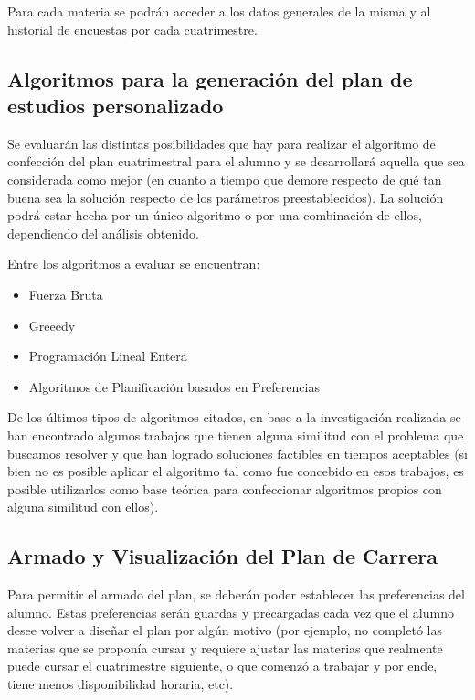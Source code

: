 \documentclass[a4paper]{article}
\begin{document}
Para cada materia se podrán acceder a los datos generales de la misma y al historial de encuestas por cada cuatrimestre.

\subsection{Algoritmos para la generación del plan de estudios personalizado}

Se evaluarán las distintas posibilidades que hay para realizar el algoritmo de confección del plan cuatrimestral para el alumno y se desarrollará aquella que sea considerada como mejor (en cuanto a tiempo que demore respecto de qué tan buena sea la solución respecto de los parámetros preestablecidos). La solución podrá estar hecha por un único algoritmo o por una combinación de ellos, dependiendo del análisis obtenido.

Entre los algoritmos a evaluar se encuentran:

\begin{itemize}
	\item Fuerza Bruta
	\item Greeedy
	\item Programación Lineal Entera
	\item Algoritmos de Planificación basados en Preferencias
\end{itemize}

De los últimos tipos de algoritmos citados, en base a la investigación realizada se han encontrado algunos trabajos que tienen alguna similitud con el problema que buscamos resolver y que han logrado soluciones factibles en tiempos aceptables (si bien no es posible aplicar el algoritmo tal como fue concebido en esos trabajos, es posible utilizarlos como base teórica para confeccionar algoritmos propios con alguna similitud con ellos).\cite{PLE_HORARIOS_UNIV, MODELOS_PLE, PAPER_ROSITA_PLANNING_WITH_PREFERENCES_1, PAPER_ROSITA_PLANNING_WITH_PREFERENCES_2, PAPER_ROSITA_PLANNING_WITH_PREFERENCES_3, PAPER_ROSITA_PLANNING_WITH_PREFERENCES_4}

\subsection{Armado y Visualización del Plan de Carrera}

Para permitir el armado del plan, se deberán poder establecer las preferencias del alumno. Estas preferencias serán guardas y precargadas cada vez que el alumno desee volver a diseñar el plan por algún motivo (por ejemplo, no completó las materias que se proponía cursar y requiere ajustar las materias que realmente puede cursar el cuatrimestre siguiente, o que comenzó a trabajar y por ende, tiene menos disponibilidad horaria, etc).
\end{document}
